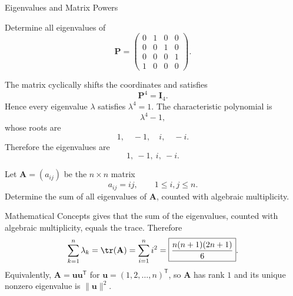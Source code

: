 \begin{expectedproblemgroup}{Eigenvalues and Matrix Powers}
        \begin{expectedsubproblem}
            Determine all eigenvalues of
            \[
                \mathbf{P}
                =
                \begin{pmatrix}
                    0&1&0&0\\
                    0&0&1&0\\
                    0&0&0&1\\
                    1&0&0&0
                \end{pmatrix}.
            \]
        \end{expectedsubproblem}

        \begin{expectedsubsolution}
            The matrix cyclically shifts the coordinates and satisfies
            \[
                \mathbf{P}^4=\mathbf{I}_4.
            \]
            Hence every eigenvalue $\lambda$ satisfies $\lambda^4=1$. The
            characteristic polynomial is
            \[
                \lambda^4-1,
            \]
            whose roots are
            \[
                1,\quad -1,\quad i,\quad -i.
            \]
            Therefore the eigenvalues are
            \[
                \boxed{1,\ -1,\ i,\ -i}.
            \]
        \end{expectedsubsolution}

        \begin{expectedsubproblem}
            Let $\mathbf{A}=(a_{ij})$ be the $n\times n$ matrix
            \[
                a_{ij}=ij,
                \qquad
                1\leq i,j\leq n.
            \]
            Determine the sum of all eigenvalues of $\mathbf{A}$, counted with
            algebraic multiplicity.
        \end{expectedsubproblem}

        \begin{expectedsubsolution}
            Mathematical Concepts gives that the sum of the eigenvalues,
            counted with algebraic multiplicity, equals the trace. Therefore
            \[
                \sum_{k=1}^{n}\lambda_k
                =
                \tr(\mathbf{A})
                =
                \sum_{i=1}^{n}i^2
                =
                \boxed{\frac{n(n+1)(2n+1)}{6}}.
            \]
            Equivalently, $\mathbf{A}=\mathbf{u}\mathbf{u}^{\mathsf T}$ for
            $\mathbf{u}=(1,2,\ldots,n)^{\mathsf T}$, so $\mathbf{A}$ has rank
            $1$ and its unique nonzero eigenvalue is $\|\mathbf{u}\|^2$.
        \end{expectedsubsolution}


\end{expectedproblemgroup}

